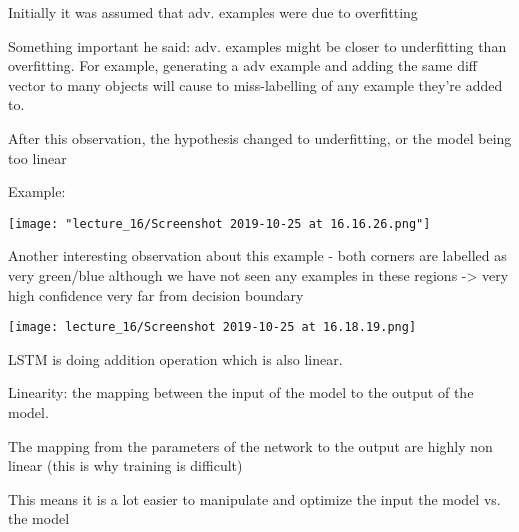 Initially it was assumed that adv. examples were due to overfitting

Something important he said: adv. examples might be closer to underfitting than overfitting. For example, generating a adv example and adding the same diff vector to many objects will cause to miss-labelling of any example they're added to.

After this observation, the hypothesis changed to underfitting, or the model being too linear

Example:

\texttt{[image: "lecture\_16/Screenshot 2019-10-25 at 16.16.26.png"]}

Another interesting observation about this example - both corners are labelled as very green/blue although we have not seen any examples in these regions -> very high confidence very far from decision boundary

\texttt{[image: lecture\_16/Screenshot 2019-10-25 at 16.18.19.png]}

LSTM is doing addition operation which is also linear. 

Linearity: the mapping between the input of the model to the output of the model.

The mapping from the parameters of the network to the output are highly non linear (this is why training is difficult)

This means it is a lot easier to manipulate and optimize the input the model vs. the model


